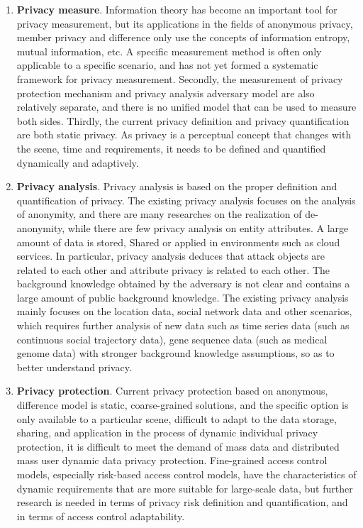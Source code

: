 \documentclass[pdftex,notypeinfo,twoside,openany,UTF8,fntef]{CASthesis}
\theoremstyle{THrm}{
	\newtheorem{question}{Question}[section]
	\newtheorem{property}{性质}[section]
	\newtheorem{assumption}{假设}[section]
	\newtheorem{claim}[lemma]{断言}
	
}
\begin{document}
\begin {enumerate}
\item \textbf{Privacy measure}. Information theory has become an important tool for privacy measurement, but its applications in the fields of anonymous privacy, member privacy and difference only use the concepts of information entropy, mutual information, etc. A specific measurement method is often only applicable to a specific scenario, and has not yet formed a systematic framework for privacy measurement. Secondly, the measurement of privacy protection mechanism and privacy analysis adversary model are also relatively separate, and there is no unified model that can be used to measure both sides. Thirdly, the current privacy definition and privacy quantification are both static privacy. As privacy is a perceptual concept that changes with the scene, time and requirements, it needs to be defined and quantified dynamically and adaptively.

\item \textbf{Privacy analysis}. Privacy analysis is based on the proper definition and quantification of privacy. The existing privacy analysis focuses on the analysis of anonymity, and there are many researches on the realization of de-anonymity, while there are few privacy analysis on entity attributes. A large amount of data is stored, Shared or applied in environments such as cloud services. In particular, privacy analysis deduces that attack objects are related to each other and attribute privacy is related to each other. The background knowledge obtained by the adversary is not clear and contains a large amount of public background knowledge. The existing privacy analysis mainly focuses on the location data, social network data and other scenarios, which requires further analysis of new data such as time series data (such as continuous social trajectory data), gene sequence data (such as medical genome data) with stronger background knowledge assumptions, so as to better understand privacy.

\item \textbf{Privacy protection}. Current privacy protection based on anonymous, difference model is static, coarse-grained solutions, and the specific option is only available to a particular scene, difficult to adapt to the data storage, sharing, and application in the process of dynamic individual privacy protection, it is difficult to meet the demand of mass data and distributed mass user dynamic data privacy protection. Fine-grained access control models, especially risk-based access control models, have the characteristics of dynamic requirements that are more suitable for large-scale data, but further research is needed in terms of privacy risk definition and quantification, and in terms of access control adaptability.


\end{enumerate}
\end{document}
